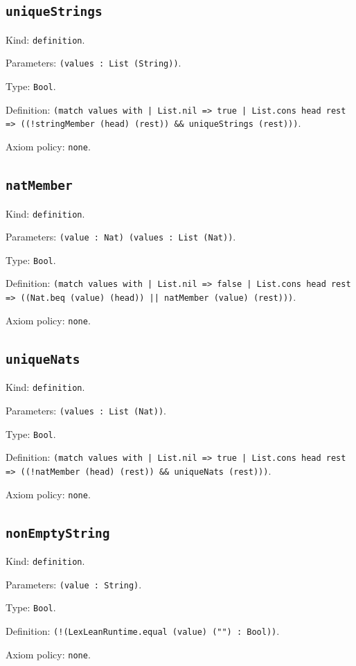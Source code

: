 \documentclass[11pt]{article}
\begin{document}
\subsection*{\texttt{uniqueStrings}}
\noindent Kind: \texttt{definition}.\par
\noindent Parameters: \texttt{(values : List (String))}.\par
\noindent Type: \texttt{Bool}.\par
\noindent Definition: \texttt{(match values with | List.nil => true | List.cons head rest => ((!stringMember (head) (rest)) \&\& uniqueStrings (rest)))}.\par
\noindent Axiom policy: \texttt{none}.\par
\subsection*{\texttt{natMember}}
\noindent Kind: \texttt{definition}.\par
\noindent Parameters: \texttt{(value : Nat) (values : List (Nat))}.\par
\noindent Type: \texttt{Bool}.\par
\noindent Definition: \texttt{(match values with | List.nil => false | List.cons head rest => ((Nat.beq (value) (head)) || natMember (value) (rest)))}.\par
\noindent Axiom policy: \texttt{none}.\par
\subsection*{\texttt{uniqueNats}}
\noindent Kind: \texttt{definition}.\par
\noindent Parameters: \texttt{(values : List (Nat))}.\par
\noindent Type: \texttt{Bool}.\par
\noindent Definition: \texttt{(match values with | List.nil => true | List.cons head rest => ((!natMember (head) (rest)) \&\& uniqueNats (rest)))}.\par
\noindent Axiom policy: \texttt{none}.\par
\subsection*{\texttt{nonEmptyString}}
\noindent Kind: \texttt{definition}.\par
\noindent Parameters: \texttt{(value : String)}.\par
\noindent Type: \texttt{Bool}.\par
\noindent Definition: \texttt{(!(LexLeanRuntime.equal (value) ("") : Bool))}.\par
\noindent Axiom policy: \texttt{none}.\par
\end{document}
